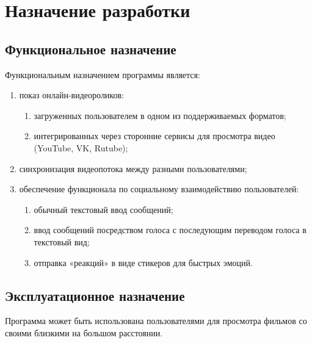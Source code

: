 \section{Назначение разработки}

\subsection{Функциональное назначение}

Функциональным назначением программы является:
\begin{enumerate}
    \item показ онлайн-видеороликов:
    \begin{enumerate}
        \item загруженных пользователем в одном из поддерживаемых форматов;
        \item интегрированных через сторонние сервисы для просмотра видео (YouTube, VK, Rutube);
    \end{enumerate}
    \item синхронизация видеопотока между разными пользователями;
    \item обеспечение функционала по социальному взаимодействию пользователей:
    \begin{enumerate}
        \item обычный текстовый ввод сообщений;
        \item ввод сообщений посредством голоса с последующим переводом голоса в текстовый вид;
        \item отправка «реакций» в виде стикеров для быстрых эмоций.
    \end{enumerate}
\end{enumerate}

\subsection{Эксплуатационное назначение}

Программа может быть использована пользователями для просмотра фильмов со своими близкими на большом расстоянии.